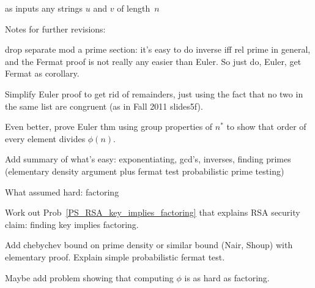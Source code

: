 as inputs any strings $u$ and $v$ of length~$n$ \fi

\begin{problems}
\classproblems
{}
\end{problems}

\begin{editingnotes}
Notes for further revisions:

drop separate mod a prime section: it's easy to do inverse iff rel prime in general, and
the Fermat proof is not really any easier than Euler.  So just do, Euler, get Fermat as
corollary.

Simplify Euler proof to get rid of remainders, just using the fact that no two in the same
list are congruent (as in Fall 2011 slides5f).

Even better, prove Euler thm using group properties of $n^*$ to show that order of every
element divides $\phi(n)$.

Add summary of what's easy: exponentiating, gcd's, inverses, finding primes (elementary
density argument plus fermat test probabilistic prime testing)

What assumed hard: factoring

Work out Prob~\ref{PS_RSA_key_implies_factoring} that explains RSA security claim: finding
key implies factoring.

Add chebychev bound on prime density or similar bound (Nair, Shoup) with elementary proof.
Explain simple probabilistic fermat test.

Maybe add problem showing that computing $\phi$ is as hard as factoring.
\end{editingnotes}

\endinput
